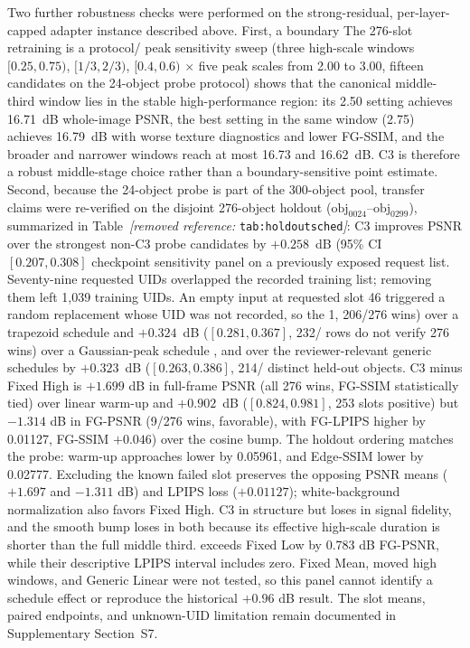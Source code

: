 \documentclass[times,twocolumn,final]{elsarticle}
\providecommand{\DIFadd}[1]{{\protect\color{blue} \sf #1}} %
\providecommand{\DIFdel}[1]{{\protect\color{red} \scriptsize #1}} %
\providecommand{\DIFaddbegin}{} %
\providecommand{\DIFaddend}{} %
\providecommand{\DIFdelbegin}{} %
\providecommand{\DIFdelend}{} %
\begin{document}
\DIFdelbegin \DIFdel{Two further robustness checks were performed on the strong-residual, per-layer-capped adapter instance described above. First, a boundary}\DIFdelend \DIFaddbegin \DIFadd{The 276-slot retraining is a protocol}\DIFaddend /\DIFdelbegin \DIFdel{peak sensitivity sweep (three high-scale windows $[0.25,0.75)$, $[1/3,2/3)$, $[0.4,0.6)$ $\times$ five peak scales from 2.00 to 3.00, fifteen candidates on the 24-object probe protocol) shows that the canonical middle-third window lies in the stable high-performance region: its 2.50 setting achieves 16.71~dB whole-image PSNR, the best setting in the same window (2.75) achieves 16.79~dB with worse texture diagnostics and lower FG-SSIM, and the broader and narrower windows reach at most 16.73 and 16.62~dB. C3 is therefore a robust middle-stage choice rather than a boundary-sensitive point estimate. Second, because the 24-object probe is part of the 300-object pool, transfer claims were re-verified on the disjoint 276-object holdout ($\mathrm{obj}_{0024}$--$\mathrm{obj}_{0299}$), summarized in Table~\textit{[removed reference: }\texttt{tab:holdoutsched}\textit{]}: C3 improves PSNR over the strongest non-C3 probe candidates by $+0.258$~dB (95\% CI $[0.207,0.308]$}\DIFdelend \DIFaddbegin \DIFadd{checkpoint sensitivity panel on a previously exposed request list. Seventy-nine requested UIDs overlapped the recorded training list; removing them left 1,039 training UIDs. An empty input at requested slot 46 triggered a random replacement whose UID was not recorded, so the 1}\DIFaddend ,\DIFdelbegin \DIFdel{206/276 wins) over a trapezoid schedule and $+0.324$~dB ($[0.281,0.367]$, 232/}\DIFdelend \DIFaddbegin \DIFadd{104 rows do not verify }\DIFaddend 276 \DIFdelbegin \DIFdel{wins) over a Gaussian-peak schedule , and over the reviewer-relevant generic schedules by $+0.323$~dB ($[0.263,0.386]$, 214/}\DIFdelend \DIFaddbegin \DIFadd{distinct held-out objects. C3 minus Fixed High is $+1.699$ dB in full-frame PSNR (all }\DIFaddend 276 \DIFdelbegin \DIFdel{wins, FG-SSIM statistically tied) over linear warm-up and $+0.902$~dB ($[0.824,0.981]$, 253}\DIFdelend \DIFaddbegin \DIFadd{slots positive) but $-1.314$ dB in FG-PSNR (9}\DIFaddend /276 \DIFdelbegin \DIFdel{wins, }\DIFdelend \DIFaddbegin \DIFadd{favorable), with FG-LPIPS higher by 0.01127, }\DIFaddend FG-SSIM \DIFdelbegin \DIFdel{$+0.046$) over the cosine bump.
The holdout ordering matches the probe: warm-up approaches }\DIFdelend \DIFaddbegin \DIFadd{lower by 0.05961, and Edge-SSIM lower by 0.02777. Excluding the known failed slot preserves the opposing PSNR means ($+1.697$ and $-1.311$ dB) and LPIPS loss ($+0.01127$); white-background normalization also favors Fixed High. }\DIFaddend C3 \DIFdelbegin \DIFdel{in structure but loses in signal fidelity, and the smooth bump loses in both because its effective high-scale duration is shorter than the full middle third. }\DIFdelend \DIFaddbegin \DIFadd{exceeds Fixed Low by 0.783 dB FG-PSNR, while their descriptive LPIPS interval includes zero. Fixed Mean, moved high windows, and Generic Linear were not tested, so this panel cannot identify a schedule effect or reproduce the historical $+0.96$ dB result. The slot means, paired endpoints, and unknown-UID limitation remain documented in Supplementary Section~S7.
}\DIFaddend
\end{document}
